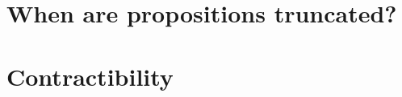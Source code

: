 \section{When are propositions truncated?}
\label{subsec:when-trunc}


\section{Contractibility}
\label{sec:contractibility}


\sectionNotes


\sectionExercises


